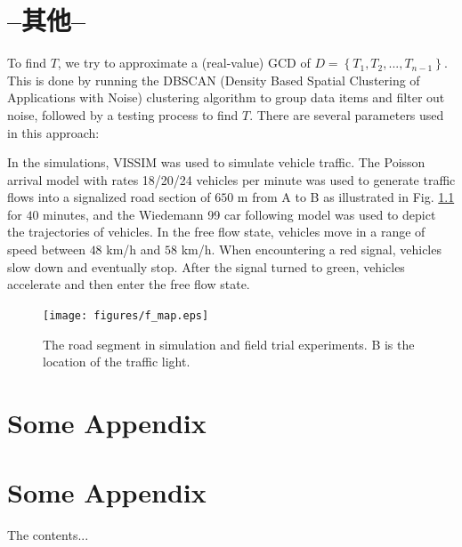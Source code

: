 \documentclass[final,oneside,onecolumn,12pt,a4paper]{book}%
\begin{document}
\chapter{--其他--}
To find $T$, we try to approximate a (real-value) GCD of $D=\left\{
T_{1},T_{2},...,T_{n-1}\right\}  $. This is done by running the DBSCAN
(Density Based Spatial Clustering of Applications with Noise) clustering
algorithm \cite{Ester1996DBSCAN} to group data items and filter out noise,
followed by a testing process to find $T$. There are several parameters used
in this approach:

In the simulations, VISSIM \cite{Mosseri2004VISSIM} was used to simulate
vehicle traffic. The Poisson arrival model with rates 18/20/24 vehicles per
minute was used to generate traffic flows into a signalized road section of
$650$ m from A to B as illustrated in Fig. \ref{fig:f_map} for $40$ minutes,
and the Wiedemann 99 car following model \cite{Mosseri2004VISSIM} was used to
depict the trajectories of vehicles. In the free flow state, vehicles move in
a range of speed between $48$ km/h and $58$ km/h. When encountering a red
signal, vehicles slow down and eventually stop. After the signal turned to
green, vehicles accelerate and then enter the free flow state.
\begin{figure}[pth]
\centerline{\texttt{[image: figures/f\_map.eps]}} \hfill\caption{The road segment in simulation and field
trial experiments. B is the location of the traffic light.}%
\label{fig:f_map}%
\end{figure}




\begin{appendices}
\chapter{Some Appendix}
\chapter{Some Appendix}
The contents...
\end{appendices}
\end{document}
